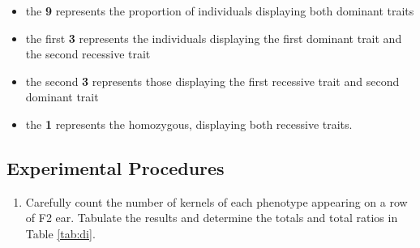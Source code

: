 \documentclass[]{book}
\providecommand{\tightlist}{%
  \setlength{\itemsep}{0pt}\setlength{\parskip}{0pt}}
\theoremstyle{definition}
\theoremstyle{definition}
\theoremstyle{definition}
\theoremstyle{remark}
\begin{document}
\begin{itemize}
\tightlist
\item
  the \textbf{9} represents the proportion of individuals displaying
  both dominant traits
\item
  the first \textbf{3} represents the individuals displaying the first
  dominant trait and the second recessive trait
\item
  the second \textbf{3} represents those displaying the first recessive
  trait and second dominant trait
\item
  the \textbf{1} represents the homozygous, displaying both recessive
  traits.
\end{itemize}

\subsection{Experimental Procedures}\label{experimental-procedures-3}

\begin{enumerate}
\def\labelenumi{\arabic{enumi}.}
\tightlist
\item
  Carefully count the number of kernels of each phenotype appearing on a
  row of F2 ear. Tabulate the results and determine the totals and total
  ratios in Table \ref{tab:di}.
\end{enumerate}
\end{document}
